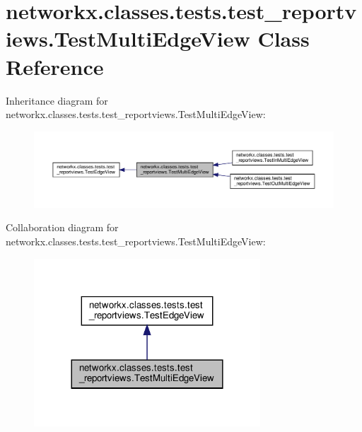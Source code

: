 \hypertarget{classnetworkx_1_1classes_1_1tests_1_1test__reportviews_1_1TestMultiEdgeView}{}\section{networkx.\+classes.\+tests.\+test\+\_\+reportviews.\+Test\+Multi\+Edge\+View Class Reference}
\label{classnetworkx_1_1classes_1_1tests_1_1test__reportviews_1_1TestMultiEdgeView}


Inheritance diagram for networkx.\+classes.\+tests.\+test\+\_\+reportviews.\+Test\+Multi\+Edge\+View\+:
\nopagebreak
\begin{figure}[H]
\begin{center}
\leavevmode
\includegraphics[width=350pt]{classnetworkx_1_1classes_1_1tests_1_1test__reportviews_1_1TestMultiEdgeView__inherit__graph}
\end{center}
\end{figure}


Collaboration diagram for networkx.\+classes.\+tests.\+test\+\_\+reportviews.\+Test\+Multi\+Edge\+View\+:
\nopagebreak
\begin{figure}[H]
\begin{center}
\leavevmode
\includegraphics[width=240pt]{classnetworkx_1_1classes_1_1tests_1_1test__reportviews_1_1TestMultiEdgeView__coll__graph}
\end{center}
\end{figure}
